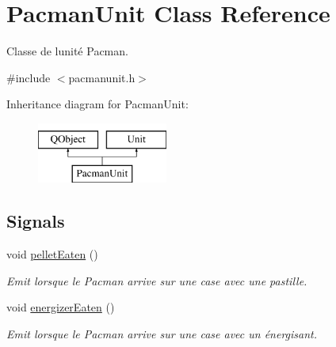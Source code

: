 \hypertarget{class_pacman_unit}{}\section{Pacman\+Unit Class Reference}
\label{class_pacman_unit}


Classe de l\textquotesingle{}unité Pacman.  




{\ttfamily \#include $<$pacmanunit.\+h$>$}

Inheritance diagram for Pacman\+Unit\+:\begin{figure}[H]
\begin{center}
\leavevmode
\includegraphics[height=2.000000cm]{class_pacman_unit}
\end{center}
\end{figure}
\subsection*{Signals}
\begin{DoxyCompactItemize}
\item 
\hypertarget{class_pacman_unit_aa1ab8429c64e26cb9b011608f97c9d08}{}void \hyperlink{class_pacman_unit_aa1ab8429c64e26cb9b011608f97c9d08}{pellet\+Eaten} ()\label{class_pacman_unit_aa1ab8429c64e26cb9b011608f97c9d08}

\begin{DoxyCompactList}\small\item\em Emit lorsque le Pacman arrive sur une case avec une pastille. \end{DoxyCompactList}\item 
\hypertarget{class_pacman_unit_a329d9e2c50972a5cae3b4fbd85f83c15}{}void \hyperlink{class_pacman_unit_a329d9e2c50972a5cae3b4fbd85f83c15}{energizer\+Eaten} ()\label{class_pacman_unit_a329d9e2c50972a5cae3b4fbd85f83c15}

\begin{DoxyCompactList}\small\item\em Emit lorsque le Pacman arrive sur une case avec un énergisant. \end{DoxyCompactList}\end{DoxyCompactItemize}
